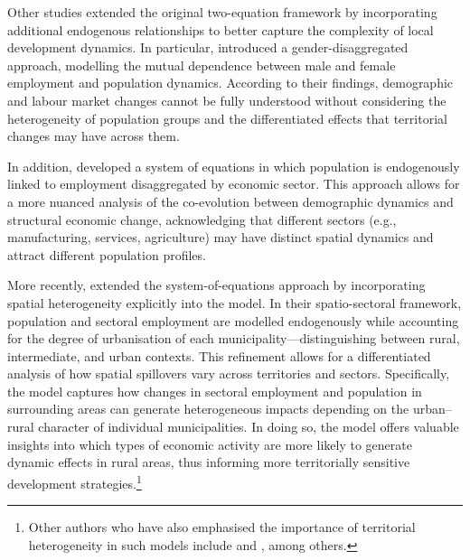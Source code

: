\documentclass[a4paper,11pt,oneside]{article}
\begin{document}
Other studies extended the original two-equation framework by incorporating additional endogenous relationships to better capture the complexity of local development dynamics. In particular, \cite{hoogstra2012gender} introduced a gender-disaggregated approach, modelling the mutual dependence between male and female employment and population dynamics. According to their findings, demographic and labour market changes cannot be fully understood without considering the heterogeneity of population groups and the differentiated effects that territorial changes may have across them.




In addition, \cite{de2012regional,de2012sectoral} developed a system of equations in which population is endogenously linked to employment disaggregated by economic sector. This approach allows for a more nuanced analysis of the co-evolution between demographic dynamics and structural economic change, acknowledging that different sectors (e.g., manufacturing, services, agriculture) may have distinct spatial dynamics and attract different population profiles.



More recently, \cite{alama2025spatio} extended the system-of-equations approach by incorporating spatial heterogeneity explicitly into the model. In their spatio-sectoral framework, population and sectoral employment are modelled endogenously while accounting for the degree of urbanisation of each municipality---distinguishing between rural, intermediate, and urban contexts. This refinement allows for a differentiated analysis of how spatial spillovers vary across territories and sectors. Specifically, the model captures how changes in sectoral employment and population in surrounding areas can generate heterogeneous impacts depending on the urban--rural character of individual municipalities. In doing so, the model offers valuable insights into which types of economic activity are more likely to generate dynamic effects in rural areas, thus informing more territorially sensitive development strategies.\footnote{Other authors who have also emphasised the importance of territorial heterogeneity in such models include \cite{alama2024urban} and \cite{feser2006harnessing}, among others.}
\end{document}
